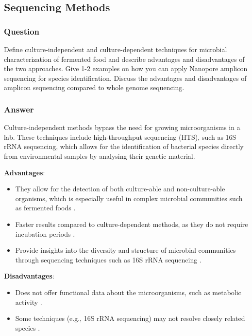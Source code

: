 \subsection{Sequencing Methods}
\subsubsection*{Question}
Define culture-independent and culture-dependent techniques for microbial characterization of fermented food and describe advantages and disadvantages of the two approaches. Give 1-2 examples on how you can apply Nanopore amplicon sequencing for species identification. Discuss the advantages and disadvantages of amplicon sequencing compared to whole genome sequencing. 

\subsubsection*{Answer}
Culture-independent methods bypass the need for growing microorganisms in a lab. These techniques include high-throughput sequencing (HTS), such as 16S rRNA sequencing, which allows for the identification of bacterial species directly from environmental samples by analysing their genetic material.

\textbf{Advantages}:
\begin{itemize}
    \item They allow for the detection of both culture-able and non-culture-able organisms, which is especially useful in complex microbial communities such as fermented foods \cite*{L3-SeqBasedClass,L5-HighThroughput}.
    \item Faster results compared to culture-dependent methods, as they do not require incubation periods \cite*{L5-DNAEnrichment}.
    \item Provide insights into the diversity and structure of microbial communities through sequencing techniques such as 16S rRNA sequencing \cite*{L3-SeqBasedClass}.
\end{itemize}

\textbf{Disadvantages}:
\begin{itemize}
    \item Does not offer functional data about the microorganisms, such as metabolic activity \cite*{L5-HighThroughput,L3-SeqBasedClass}.
    \item Some techniques (e.g., 16S rRNA sequencing) may not resolve closely related species \cite*{L5-HighThroughput}.
\end{itemize}

